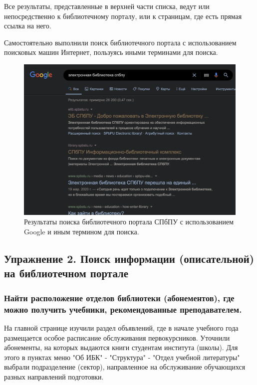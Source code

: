 \documentclass[14pt,a4paper,report]{report}
\begin{document}
Все результаты, представленные в верхней части списка, ведут или непосредственно к библиотечному порталу, или к страницам, где есть прямая ссылка на него.

\clearpage

Самостоятельно выполнили поиск библиотечного портала с использованием поисковых машин Интернет, пользуясь иными терминами для поиска.

\begin{figure}[h!]
\centering
\includegraphics[scale = 0.5]{116.png}
\caption{Результаты поиска библиотечного портала СПбПУ с использованием Google и иным термином для поиска.}
\label{image:1}
\end{figure}

\subsection{Упражнение 2. Поиск информации (описательной) на библиотечном портале}

\subsubsection{Найти расположение отделов библиотеки (абонементов), где можно получить учебники, рекомендованные преподавателем.}

На главной странице изучили раздел объявлений, где в начале учебного года размещается особое расписание обслуживания первокурсников.
Уточнили абонементы, на которых выдаются книги студентам института (школы). Для этого в пунктах меню "Об ИБК" - "Структура" - "Отдел учебной литературы" выбрали подразделение (сектор), направленное на обслуживание обучающихся разных направлений подготовки.
\end{document}
